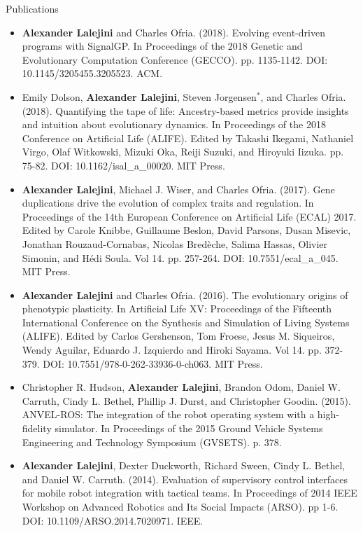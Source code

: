 \begin{rSection}{Publications}
\begin{itemize}
\item \textbf{Alexander Lalejini} and Charles Ofria. (2018).
Evolving event-driven programs with SignalGP.
In Proceedings of the 2018 Genetic and Evolutionary Computation Conference (GECCO). pp. 1135-1142.
DOI: 10.1145/3205455.3205523. ACM.

\item Emily Dolson, \textbf{Alexander Lalejini}, Steven Jorgensen$^{*}$, and Charles Ofria. (2018).
Quantifying the tape of life: Ancestry-based metrics provide insights and intuition about evolutionary dynamics.
In Proceedings of the 2018 Conference on Artificial Life (ALIFE).
Edited by Takashi Ikegami, Nathaniel Virgo, Olaf Witkowski, Mizuki Oka, Reiji Suzuki, and Hiroyuki Iizuka. pp. 75-82.
DOI: 10.1162/isal\_a\_00020. MIT Press.

\item \textbf{Alexander Lalejini}, Michael J. Wiser, and Charles Ofria. (2017).
Gene duplications drive the evolution of complex traits and regulation.
In Proceedings of the 14th European Conference on Artificial Life (ECAL) 2017.
Edited by Carole Knibbe, Guillaume Beslon, David Parsons, Dusan Misevic, Jonathan Rouzaud-Cornabas, Nicolas Bredèche, Salima Hassas, Olivier Simonin, and Hédi Soula. Vol 14. pp. 257-264.
DOI: 10.7551/ecal\_a\_045. MIT Press.

\item \textbf{Alexander Lalejini} and Charles Ofria. (2016).
The evolutionary origins of phenotypic plasticity.
In Artificial Life XV: Proceedings of the Fifteenth International Conference on the Synthesis and Simulation of Living Systems (ALIFE).
Edited by Carlos Gershenson, Tom Froese, Jesus M. Siqueiros, Wendy Aguilar, Eduardo J. Izquierdo and Hiroki Sayama. Vol 14. pp. 372-379.
DOI: 10.7551/978-0-262-33936-0-ch063. MIT Press.

\item Christopher R. Hudson, \textbf{Alexander Lalejini}, Brandon Odom, Daniel W. Carruth, Cindy L. Bethel, Phillip J. Durst, and Christopher Goodin. (2015).
ANVEL-ROS: The integration of the robot operating system with a high-fidelity simulator.
In Proceedings of the 2015 Ground Vehicle Systems Engineering and Technology Symposium (GVSETS). p. 378.

\item \textbf{Alexander Lalejini}, Dexter Duckworth, Richard Sween, Cindy L. Bethel, and Daniel W. Carruth. (2014).
Evaluation of supervisory control interfaces for mobile robot integration with tactical teams.
In Proceedings of 2014 IEEE Workshop on Advanced Robotics and Its Social Impacts (ARSO). pp 1-6.
DOI: 10.1109/ARSO.2014.7020971. IEEE.


\end{itemize}
\end{rSection}
